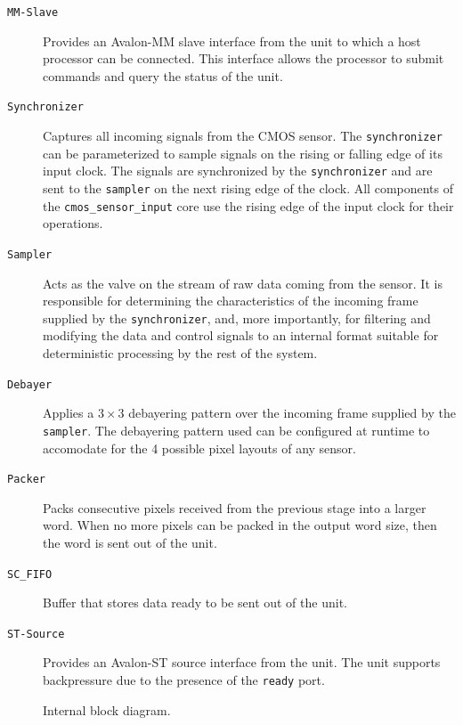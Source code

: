 \documentclass{article}
\def \cmossensorinput {\texttt{cmos\_sensor\_input} }
\begin{document}
\begin{description}
    \item[\texttt{MM-Slave}] Provides an Avalon-MM slave interface from the unit to which a host processor can be connected. This interface allows the processor to submit commands and query the status of the unit.
    \item[\texttt{Synchronizer}] Captures all incoming signals from the CMOS sensor. The \texttt{synchronizer} can be parameterized to sample signals on the rising or falling edge of its input clock. The signals are synchronized by the \texttt{synchronizer} and are sent to the \texttt{sampler} on the next rising edge of the clock. All components of the \cmossensorinput core use the rising edge of the input clock for their operations.
    \item[\texttt{Sampler}] Acts as the valve on the stream of raw data coming from the sensor. It is responsible for determining the characteristics of the incoming frame supplied by the \texttt{synchronizer}, and, more importantly, for filtering and modifying the data and control signals to an internal format suitable for deterministic processing by the rest of the system.
    \item[\texttt{Debayer}] Applies a $3\times3$ debayering pattern over the incoming frame supplied by the \texttt{sampler}. The debayering pattern used can be configured at runtime to accomodate for the 4 possible pixel layouts of any sensor.
    \item[\texttt{Packer}] Packs consecutive pixels received from the previous stage into a larger word. When no more pixels can be packed in the output word size, then the word is sent out of the unit.
    \item[\texttt{SC\_FIFO}] Buffer that stores data ready to be sent out of the unit.
    \item[\texttt{ST-Source}] Provides an Avalon-ST source interface from the unit. The unit supports backpressure due to the presence of the \texttt{ready} port.
\end{description}

\begin{figure}[h!]
    \centering
    \caption{Internal block diagram.}
    \label{fig:cmos_sensor_input_internal}
\end{figure}
\end{document}
